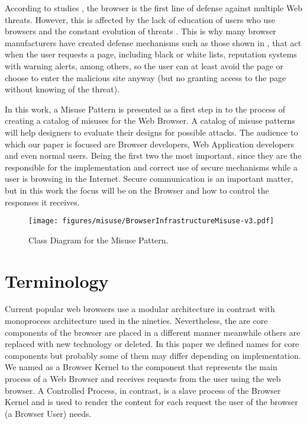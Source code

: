 \documentclass{sig-alternate-05-2015}
\begin{document}
According to studies \cite{browSecPhish,Labs2013,rowSecSEMBlock}, the browser is the first line of defense against multiple Web threats. However, this is affected by the lack of education of users who use browsers and the constant evolution of threats \cite{browSecPhish}. This is why many browser manufacturers have created defense mechanisms such as those shown in \cite{Drake2011}, that act when the user requests a page, including black or white lists, reputation systems \cite{Rajab2013} with warning alerts, among others, so the user can at least avoid the page or choose to enter the malicious site anyway (but no granting access to the page without knowing of the threat).

In this work, a Misuse Pattern is presented as a first step in to the process of creating a catalog of misuses for the Web Browser. A catalog of misuse patterns will help designers to evaluate their designs for possible attacks. The audience to which our paper is focused are Browser developers, Web Application developers and even normal users. Being the first two the most important, since they are the responsible for the implementation and correct use of secure mechanisms while a user is browsing in the Internet. Secure communication is an important matter, but in this work the focus will be on the Browser and how to control the responses it receives.

\begin{figure*}[h!t]
\vspace*{-2cm}
  \centering
  \texttt{[image: figures/misuse/BrowserInfrastructureMisuse-v3.pdf]}
  \vspace*{-2cm}
  \caption{Class Diagram for the Misuse Pattern.}
  \label{fig:BIMisuse}
\end{figure*}

\section{Terminology}
Current popular web browsers use a modular architecture in contrast with monoprocess architecture used in the nineties. Nevertheless, the are core components of the browser are placed in a different manner meanwhile others are replaced with new technology or deleted. In this paper we defined names for core components but probably some of them may differ depending on implementation. We named as a Browser Kernel to the component that represents the main process of a Web Browser and receives requests from the user using the web browser. A Controlled Process, in contrast, is a slave process of the Browser Kernel and is used to render the content for each request the user of the browser (a Browser User) needs.
\end{document}
